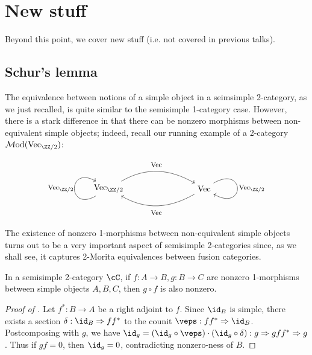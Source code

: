 \documentclass[12pt]{article}
\newcommand{\Mod}{{\mathcal{M}\textrm{od}}}
\newcommand{\Vect}{{\textrm{Vec}}}
\newcommand{\ModA}[1]{{\Mod(#1)}}
\begin{document}
\section{New stuff}

Beyond this point, we cover new stuff
(i.e. not covered in previous talks).

\subsection{Schur's lemma}

The equivalence between notions of a simple object
in a seimsimple 2-category,
as we just recalled,
is quite similar to the semisimple 1-category case.
However, there is a stark difference in that
there can be nonzero morphisms between
non-equivalent simple objects;
indeed, recall our running example of a 2-category
$\ModA{\Vect_{\ZZ/2}}$:

\[
\begin{tikzpicture}
\node (a) at (0,0) {$\Vect_{\ZZ/2}$};
\node (b) at (4,0) {$\Vect$};
\draw[->] (a) to[out=30,in=150] (b);
\node at (2,1) {\footnotesize $\Vect$};
\draw[->] (b) to[out=-150,in=-30] (a);
\node at (2,-1) {\footnotesize $\Vect$};
\draw[->] (a) .. controls +(-150:2cm) and +(150:2cm) .. (a);
\node at (-2,0) {\footnotesize $\Vect_{\ZZ/2}$};
\draw[->] (b) .. controls +(30:2cm) and +(-30:2cm) .. (b);
\node at (6,0) {\footnotesize $\Vect_{\ZZ/2}$};
\end{tikzpicture}
\]


The existence of nonzero 1-morphisms
between non-equivalent simple objects
turns out to be a very important aspect of semisimple 2-categories
since, as we shall see,
it captures 2-Morita equivalences between fusion categories.

\begin{proposition}
\label{p:schur-lemma}
In a semisimple 2-category $\cC$,
if $f: A \to B, g: B \to C$ are nonzero 1-morphisms
between simple objects $A,B,C$,
then $g \circ f$ is also nonzero.
\end{proposition}

\begin{proof}[Proof of ]
Let $f^*: B \to A$ be a right adjoint to $f$.
Since $\id_B$ is simple, there exists a section
$\delta: \id_B \Rightarrow ff^*$
to the counit $\veps: ff^* \Rightarrow \id_B$.
Postcomposing with $g$,
we have $\id_g = (\id_g \circ \veps) \cdot (\id_g \circ \delta):
g \Rightarrow gff^* \Rightarrow g$.
Thus if $gf = 0$, then $\id_g = 0$,
contradicting nonzero-ness of $B$.
\end{proof}
\end{document}
